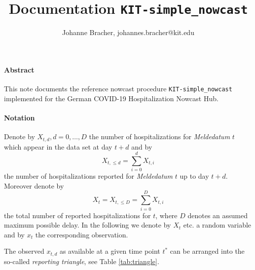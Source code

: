 \documentclass[a4paper, 11pt]{article}\usepackage[]{graphicx}\usepackage[]{color}
\begin{document}
\title{Documentation \texttt{KIT-simple\_nowcast}}
\author{Johanne Bracher, johannes.bracher@kit.edu}
\maketitle

\paragraph{Abstract}This note documents the reference nowcast procedure \texttt{KIT-simple\_nowcast} implemented for the German COVID-19 Hospitalization Nowcast Hub.

\paragraph{Notation}

Denote by $X_{t, d}, d = 0, \dots, D$ the number of hospitalizations for \textit{Meldedatum} $t$ which appear in the data set at day $t + d$ and by
$$
X_{t, \leq d} = \sum_{i = 0}^d X_{t, i}
$$
the number of hospitalizations reported for \textit{Meldedatum} $t$ up to day $t + d$. Moreover denote by
$$
X_t = X_{t, \leq D} = \sum_{i = 0}^D X_{t, i}
$$
the total number of reported hospitalizations for $t$, where $D$ denotes an assumed maximum possible delay. In the following we denote by $X_t$ etc. a random variable and by $x_t$ the corresponding observation.

The observed $x_{t, d}$ as available at a given time point $t^*$ can be arranged into the so-called \textit{reporting triangle}, see Table \ref{tab:triangle}.

\bigskip
\end{document}
